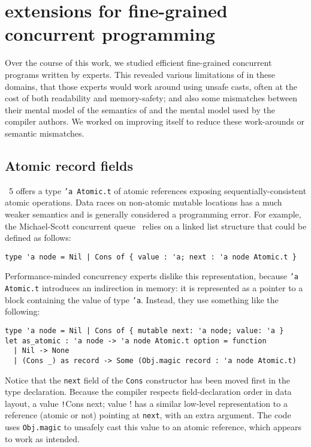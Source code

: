 \section{\OCaml extensions for fine-grained concurrent programming}
\label{sec:ocaml}

Over the course of this work, we studied efficient fine-grained concurrent \OCaml programs written by experts.
This revealed various limitations of \OCaml in these domains, that those experts would work around using unsafe casts, often at the cost of both readability and memory-safety; and also some mismatches between their mental model of the semantics of \OCaml and the mental model used by the \OCaml compiler authors.
We worked on improving \OCaml itself to reduce these work-arounds or semantic mismatches.

\subsection{Atomic record fields}
\label{sec:atomic-record-fields}

\OCaml~5 offers a type \texttt{'a Atomic.t} of atomic references exposing sequentially-consistent atomic operations.
Data races on non-atomic mutable locations has a much weaker semantics and is generally considered a programming error.
For example, the Michael-Scott concurrent queue~\cite{DBLP:conf/podc/MichaelS96} relies on a linked list structure that could be defined as follows:

\begin{verbatim}
type 'a node = Nil | Cons of { value : 'a; next : 'a node Atomic.t }
\end{verbatim}

Performance-minded concurrency experts dislike this representation, because \texttt{'a Atomic.t} introduces an indirection in memory: it is represented as a pointer to a block containing the value of type \texttt{'a}.
Instead, they use something like the following:

\begin{verbatim}
type 'a node = Nil | Cons of { mutable next: 'a node; value: 'a }
let as_atomic : 'a node -> 'a node Atomic.t option = function
  | Nil -> None
  | (Cons _) as record -> Some (Obj.magic record : 'a node Atomic.t)
\end{verbatim}

Notice that the \texttt{next} field of the \texttt{Cons} constructor has been moved first in the type declaration.
Because the \OCaml compiler respects field-declaration order in data layout, a value \texttt!Cons { next; value }! has a similar low-level representation to a reference (atomic or not) pointing at \texttt{next}, with an extra argument.
The code uses \texttt{Obj.magic} to unsafely cast this value to an atomic reference, which appears to work as intended.

